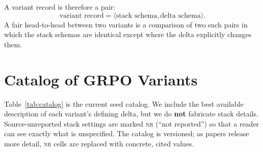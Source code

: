 \documentclass[11pt]{article}
\newcommand{\nr}{\textsc{nr}}
\newcommand{\grpo}{\textsc{GRPO}}
\begin{document}
A variant record is therefore a pair:
\[
\text{variant record} = \langle \text{stack schema}, \text{delta schema} \rangle .
\]
A fair head-to-head between two variants is a comparison of two such pairs in
which the stack schemas are identical except where the delta explicitly changes
them.

\section{Catalog of \grpo{} Variants}
\label{sec:catalog}

Table~\ref{tab:catalog} is the current seed catalog. We include the best
available description of each variant's defining delta, but we do \textbf{not}
fabricate stack details. Source-unreported stack settings are marked \nr{}
(``not reported'') so that a reader can see exactly what is unspecified. The
catalog is versioned; as papers release more detail, \nr{} cells are replaced
with concrete, cited values.
\end{document}
